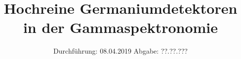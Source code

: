 

\subject{Versuch 18}
\title{Hochreine Germaniumdetektoren in der Gammaspektronomie}
\date{%
  Durchführung: 08.04.2019
  \hspace{3em}
  Abgabe: ??.??.???
}



\maketitle
\thispagestyle{empty}
\tableofcontents
\newpage






\printbibliography{}


